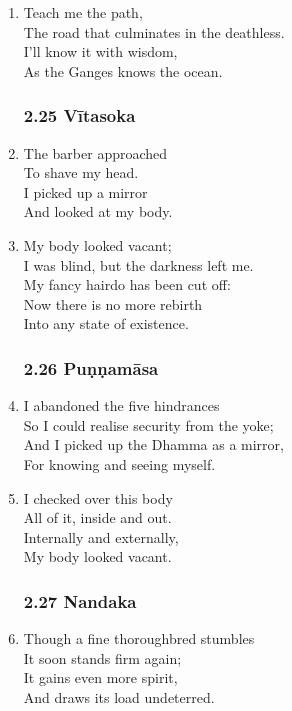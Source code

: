\documentclass[10pt, openany]{book}
\begin{document}
\begin{enumerate}
\item Teach me the path,\\
The road that culminates in the deathless.\\
I’ll know it with wisdom,\\
As the Ganges knows the ocean.

\subsubsection*{2.25 Vītasoka}

\item The barber approached\\
To shave my head.\\
I picked up a mirror\\
And looked at my body.

\item My body looked vacant;\\
I was blind, but the darkness left me.\\
My fancy hairdo has been cut off:\\
Now there is no more rebirth\\
Into any state of existence.

\subsubsection*{2.26 Puṇṇamāsa}

\item I abandoned the five hindrances\\
So I could realise security from the yoke;\\
And I picked up the Dhamma as a mirror,\\
For knowing and seeing myself.

\item I checked over this body\\
All of it, inside and out.\\
Internally and externally,\\
My body looked vacant.

\subsubsection*{2.27 Nandaka}

\item Though a fine thoroughbred stumbles\\
It soon stands firm again;\\
It gains even more spirit,\\
And draws its load undeterred.


\end{enumerate}
\end{document}
